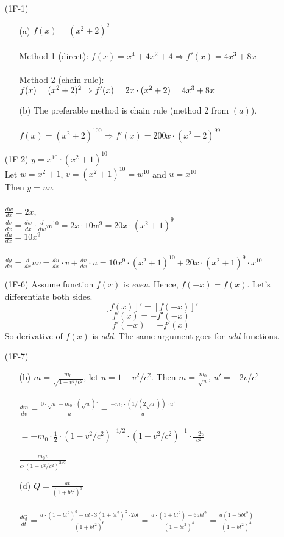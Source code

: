 \documentclass{article}
\begin{document}
\begin{itemize}
\item[(1F-1)]
\begin{itemize}
    \item[(a)] $f(x) = (x^2+2)^2$ \\ \\
    Method 1 (direct): $f(x) = x^4 + 4x^2 + 4 \Rightarrow f'(x) = 4x^3 + 8x$ \\ \\
    Method 2 (chain rule): $f(x) = (x^2+2)^2 \Rightarrow f'(x) = 2x \cdot (x^2+2)\\ = 4x^3+8x$
    \item[(b)] The preferable method is chain rule (method 2 from $(a)$). \\ \\
    $f(x) = (x^2+2)^{100} \Rightarrow f'(x) = 200x \cdot (x^2 + 2)^{99}$
\end{itemize}
\item[(1F-2)] $y = x^{10} \cdot (x^2+1)^{10}$ \\
Let $w = x^2+1$, $v = (x^2+1)^{10} = w^{10}$ and $u = x^{10}$ \\
Then $y = uv$.\\ \\ 
$\frac{dw}{dx} = 2x$, \\ $\frac{dv}{dx} = \frac{dw}{dx} \cdot \frac{d}{dw}w^{10} = 2x \cdot 10w^9 = 20x \cdot (x^2+1)^9$ \\
$\frac{du}{dx} = 10x^9$ \\ \\
$\frac{dy}{dx} = \frac{d}{dx}uv = \frac{du}{dx} \cdot v + \frac{dv}{dx} \cdot u = 10x^9 \cdot (x^2+1)^{10} + 20x \cdot (x^2+1)^9 \cdot x^{10}$

\item[(1F-6)] Assume function $f(x)$ is \textit{even}. Hence, $f(-x) = f(x)$. Let's differentiate both sides.
\[ \left[ f(x) \right]' = \left[ f(-x) \right]' \]
\[ f'(x) = -f'(-x) \]
\[ f'(-x) = -f'(x) \]
So derivative of $f(x)$ is \textit{odd}. The same argument goes for \textit{odd} functions.

\item[(1F-7)]
\begin{itemize}
    \item[(b)] $m = \frac{m_0}{\sqrt{1-v^2/c^2}}$, let $u = 1 - v^2/c^2$. Then $m = \frac{m_0}{\sqrt{u}}$, $u' = -2v/c^2$ \\ \\
    $\frac{dm}{dv} = \frac{0 \cdot \sqrt{u} - m_0 \cdot (\sqrt{u})'}{u} = \frac{-m_0 \cdot (1/(2\sqrt{u})) \cdot u'}{u}$ \\ \\ $= -m_0 \cdot \frac{1}{2} \cdot (1-v^2/c^2)^{-1/2} \cdot (1-v^2/c^2)^{-1} \cdot \frac{-2v}{c^2}$ \\ \\ $\frac{m_0v}{c^2(1-v^2/c^2)^{3/2}}$
    \item[(d)] $Q = \frac{at}{(1+bt^2)^3}$ \\ \\ $\frac{dQ}{dt} = \frac{a \cdot (1+bt^2)^3 - at \cdot 3(1+bt^2)^2 \cdot 2bt}{(1+bt^2)^6} = \frac{a \cdot (1+bt^2) - 6abt^2}{(1+bt^2)^4} = \frac{a(1-5bt^2)}{(1+bt^2)^4}$
\end{itemize}


\end{itemize}
\end{document}
